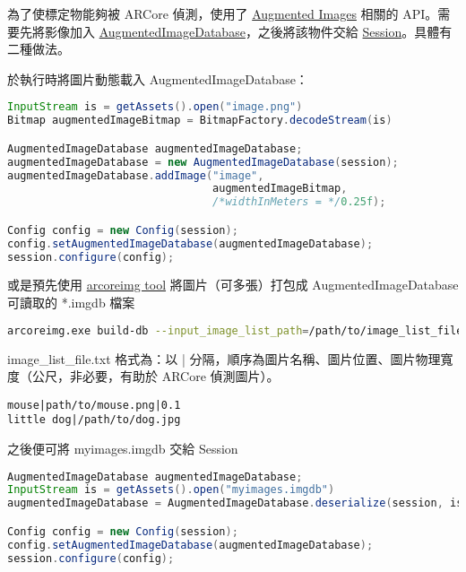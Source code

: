 為了使標定物能夠被 ARCore 偵測，使用了 \href{https://developers.google.com/ar/develop/java/augmented-images}{Augmented Images} 相關的 API。需要先將影像加入 \href{https://developers.google.com/ar/reference/java/com/google/ar/core/AugmentedImageDatabase}{AugmentedImageDatabase}，之後將該物件交給 \href{https://developers.google.com/ar/reference/java/com/google/ar/core/Session}{Session}。具體有二種做法。

於執行時將圖片動態載入 AugmentedImageDatabase：

\begin{lstlisting}[language=Java, caption=動態載入圖片]
InputStream is = getAssets().open("image.png")
Bitmap augmentedImageBitmap = BitmapFactory.decodeStream(is)

AugmentedImageDatabase augmentedImageDatabase;
augmentedImageDatabase = new AugmentedImageDatabase(session);
augmentedImageDatabase.addImage("image",　
                                augmentedImageBitmap,
                                /*widthInMeters = */0.25f);

Config config = new Config(session);
config.setAugmentedImageDatabase(augmentedImageDatabase);
session.configure(config);
\end{lstlisting}

或是預先使用 \href{https://developers.google.com/ar/develop/java/augmented-images/arcoreimg}{arcoreimg tool} 將圖片（可多張）打包成 AugmentedImageDatabase 可讀取的 *.imgdb 檔案

\begin{lstlisting}[language=bash, caption=使用 arcoreimg tool 將圖片打包]
arcoreimg.exe build-db --input_image_list_path=/path/to/image_list_file.txt --output_db_path=/path/to/myimages.imgdb
\end{lstlisting}

image\_list\_file.txt 格式為：以 | 分隔，順序為圖片名稱、圖片位置、圖片物理寬度（公尺，非必要，有助於 ARCore 偵測圖片）。

\begin{lstlisting}[caption=image\_list\_file.txt 範例]
mouse|path/to/mouse.png|0.1
little dog|/path/to/dog.jpg
\end{lstlisting}

之後便可將 myimages.imgdb 交給 Session

\begin{lstlisting}[language=Java, caption=將 myimages.imgdb 交給 Session]
AugmentedImageDatabase augmentedImageDatabase;
InputStream is = getAssets().open("myimages.imgdb")
augmentedImageDatabase = AugmentedImageDatabase.deserialize(session, is);

Config config = new Config(session);
config.setAugmentedImageDatabase(augmentedImageDatabase);
session.configure(config);
\end{lstlisting}

